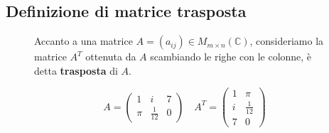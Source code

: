 \documentclass[a4paper]{article}
\theoremstyle{break}
\theoremstyle{break}
\theoremstyle{break}
\theoremstyle{break}
\begin{document}
\subsection{Definizione di matrice trasposta}
\begin{figure}[H]
\begin{definition}
Accanto a una matrice \( A = (a_{ij}) \in M_{m \times n}(\mathbb{C}) \), consideriamo
la matrice \( A^T \) ottenuta da \( A \) scambiando le righe con le colonne,
è detta \textbf{trasposta} di \( A \).
\end{definition}
\end{figure}
\begin{figure}[H]
\begin{example}
\[
  A = \begin{pmatrix} 
    1 & i & 7\\
    \pi & \frac{1}{12} & 0
  \end{pmatrix} 
  \quad
  A^T = \begin{pmatrix} 
    1 & \pi \\
    i & \frac{1}{12} \\
    7 & 0
  \end{pmatrix}
\] 
\end{example}
\end{figure}
\end{document}
